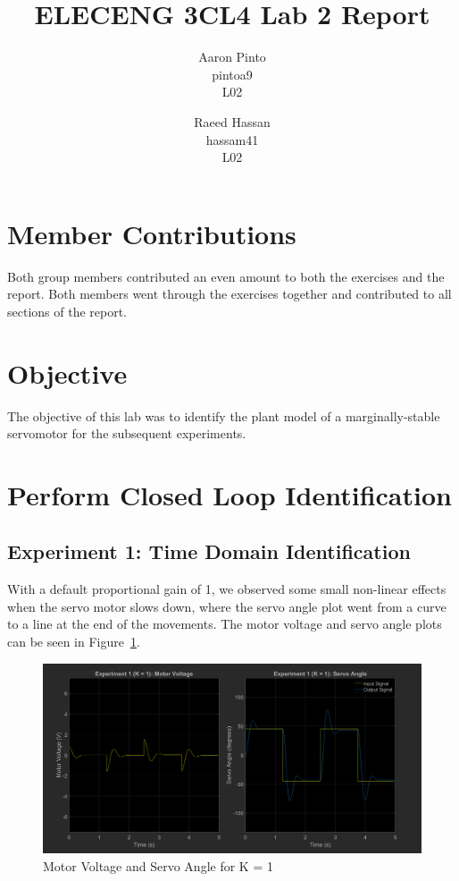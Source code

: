\documentclass[12pt]{article}
\title{ELECENG 3CL4 Lab 2 Report}
\author{
    Aaron Pinto \\
    pintoa9 \\
    L02
    \and
    Raeed Hassan \\
    hassam41 \\
    L02
}
\begin{document}
\maketitle
\clearpage

\section*{Member Contributions}
Both group members contributed an even amount to both the exercises and the report. Both members went through the exercises together and contributed to all sections of the report.

\section*{Objective} %
The objective of this lab was to identify the plant model of a marginally-stable servomotor for the subsequent experiments.

\setcounter{section}{2}
\section{Perform Closed Loop Identification}
\subsection{Experiment 1: Time Domain Identification}
With a default proportional gain of 1, we observed some small non-linear effects when the servo motor slows down, where the servo angle plot went from a curve to a line at the end of the movements. The motor voltage and servo angle plots can be seen in Figure~\ref{fig:exp1_k1}.
\begin{figure}[h!]
    \centering
    \includegraphics[width=\textwidth]{exp1_k1}
    \caption{\label{fig:exp1_k1}Motor Voltage and Servo Angle for K = 1}
\end{figure}
\end{document}
